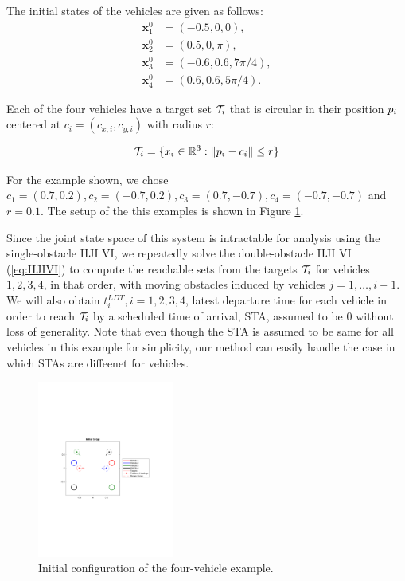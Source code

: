 The initial states of the vehicles are given as follows:
\begin{equation}
\begin{aligned}
\bm{x}_1^0 &= (-0.5, 0, 0), \\
\bm{x}_2^0 &= (0.5, 0, \pi), \\
\bm{x}_3^0 &= \left(-0.6, 0.6, 7\pi/4\right), \\
\bm{x}_4^0 &= \left(0.6, 0.6, 5\pi/4\right).\
\end{aligned}
\end{equation}

\noindent Each of the four vehicles have a target set $\mathcal{T}_i$ that is circular in their position $p_i$ centered at $c_i = (c_{x,i}, c_{y,i})$ with radius $r$:

\begin{equation}
\mathcal{T}_i = \{x_i \in \mathbb{R}^3: \|p_i - c_i\| \le r\}
\end{equation}

\noindent For the example shown, we chose $c_1 = (0.7, 0.2), c_2 = (-0.7, 0.2), c_3 = (0.7, -0.7), c_4 = (-0.7, -0.7)$ and $r = 0.1$. The setup of the this examples is shown in Figure \ref{fig:init_setup}.

Since the joint state space of this system is intractable for analysis using the single-obstacle HJI VI, we repeatedly solve the double-obstacle HJI VI (\ref{eq:HJIVI}) to compute the reachable sets from the targets $\mathcal{T}_i$ for vehicles $1,2,3,4$, in that order, with moving obstacles induced by vehicles $j=1,\ldots,i-1$. We will also obtain $t_i^{LDT},i=1,2,3,4$, latest departure time for each vehicle in order to reach $\mathcal{T}_i$ by a scheduled time of arrival, STA, assumed to be $0$ without loss of generality. Note that even though the STA is assumed to be same for all vehicles in this example for simplicity, our method can easily handle the case in which STAs are diffeenet for vehicles.

\begin{figure}
  \centering
  \includegraphics[width=0.4\textwidth]{"fig/init_setup"}
  \caption{Initial configuration of the four-vehicle example.}
  \label{fig:init_setup}
\end{figure}

